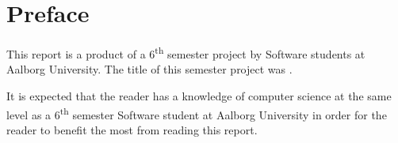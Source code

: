 \chapter*{Preface}
This report is a product of a 6\textsuperscript{th} semester project by Software students at Aalborg University. The title of this semester project was \projecttheme.

It is expected that the reader has a knowledge of computer science at the same level as a 6\textsuperscript{th} semester Software student at Aalborg University in order for the reader to benefit the most from reading this report.